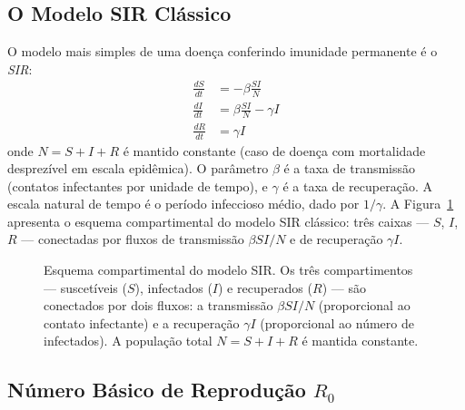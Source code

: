 \subsection{O Modelo SIR Clássico}
\label{sub:image10-sir-classico}

O modelo mais simples de uma doença conferindo imunidade permanente é o
\emph{SIR}:
\begin{align}
\frac{dS}{dt} &= -\beta \frac{SI}{N} \\
\frac{dI}{dt} &= \beta \frac{SI}{N} - \gamma I \\
\frac{dR}{dt} &= \gamma I
\end{align}
onde $N = S + I + R$ é mantido constante (caso de doença com mortalidade
desprezível em escala epidêmica). O parâmetro $\beta$ é a taxa de transmissão
(contatos infectantes por unidade de tempo), e $\gamma$ é a taxa de
recuperação. A escala natural de tempo é o período infeccioso médio, dado
por $1/\gamma$. A Figura~\ref{fig:10-sir} apresenta o esquema
compartimental do modelo SIR clássico: três caixas --- $S$, $I$, $R$ ---
conectadas por fluxos de transmissão $\beta SI/N$ e de recuperação $\gamma I$.

\begin{figure}[htbp]
\centering
{}
\caption{Esquema compartimental do modelo SIR. Os três compartimentos --- suscetíveis ($S$), infectados ($I$) e recuperados ($R$) --- são conectados por dois fluxos: a transmissão $\beta SI/N$ (proporcional ao contato infectante) e a recuperação $\gamma I$ (proporcional ao número de infectados). A população total $N = S + I + R$ é mantida constante.}
\label{fig:10-sir}
\end{figure}

\subsection{Número Básico de Reprodução $R_0$}
\label{sub:image10-R0}

